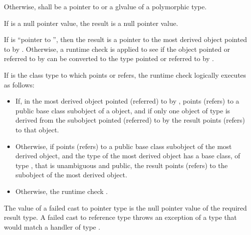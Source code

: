 \pnum
Otherwise,  shall be a pointer to or a glvalue of a polymorphic
type.

\pnum
If  is a null pointer value, the result is a null pointer value.

\pnum
If  is ``pointer to \cv{} '', then the result
is a pointer to the most derived object pointed to by .
Otherwise, a runtime check is applied to see if the object pointed or
referred to by  can be converted to the type pointed or
referred to by .

\pnum
If  is the class type to which  points or refers, the runtime
check logically executes as follows:

\begin{itemize}
\item If, in the most derived object pointed (referred) to by ,
 points (refers) to a public base class subobject of a
 object, and if only one object of type  is derived
from the subobject pointed (referred) to by  the result points (refers) to that  object.

\item Otherwise, if  points (refers) to a public base
class subobject of the most derived object, and the type of the most
derived object has a base class, of type , that is unambiguous
and public, the result points (refers) to the
 subobject of the most derived object.

\item Otherwise, the
runtime check .
\end{itemize}

\pnum
The value of a failed cast to pointer type is the null pointer value of
the required result type. A failed cast to reference type throws
an exception of a type that would match a
handler of type .


